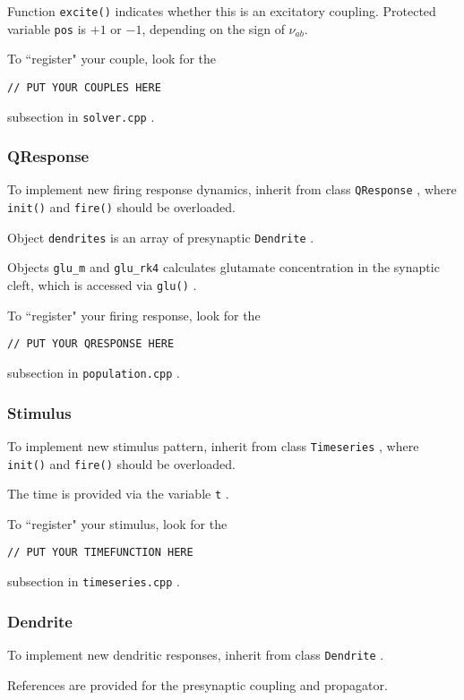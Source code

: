 \documentclass[12pt,a4paper]{article}
\newcommand{\type}[1]{{\small\small\tt #1} }
\begin{document}
Function \type{excite()} indicates whether this is an excitatory coupling. Protected variable \type{pos} is $+1$ or $-1$, depending on the sign of \(\nu_{ab}\).

To ``register" your couple, look for the
\begin{lstlisting}
// PUT YOUR COUPLES HERE
\end{lstlisting}
subsection in \type{solver.cpp}.

\subsubsection{QResponse}

To implement new firing response dynamics, inherit from class \type{QResponse}, where \type{init()} and \type{fire()} should be overloaded.

Object \type{dendrites} is an array of presynaptic \type{Dendrite}.

Objects \type{glu\_m} and \type{glu\_rk4} calculates glutamate concentration in the synaptic cleft, which is accessed via \type{glu()}.

To ``register" your firing response, look for the
\begin{lstlisting}
// PUT YOUR QRESPONSE HERE
\end{lstlisting}
subsection in \type{population.cpp}.

\subsubsection{Stimulus}

To implement new stimulus pattern, inherit from class \type{Timeseries}, where \type{init()} and \type{fire()} should be overloaded.

The time is provided via the variable \type{t}.

To ``register" your stimulus, look for the
\begin{lstlisting}
// PUT YOUR TIMEFUNCTION HERE
\end{lstlisting}
subsection in \type{timeseries.cpp}.

\subsubsection{Dendrite}
\label{sec:dendrite}

To implement new dendritic responses, inherit from class \type{Dendrite}.

References are provided for the presynaptic coupling and propagator.
\end{document}
